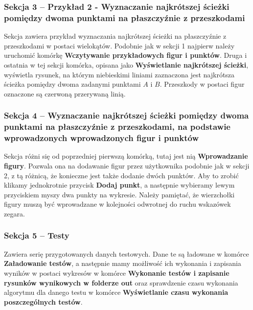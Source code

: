 \documentclass[12pt]{article}
\begin{document}
			\subsubsection{Sekcja 3 -- Przykład 2 - Wyznaczanie najkrótszej ścieżki pomiędzy dwoma punktami na płaszczyźnie z przeszkodami}
				Sekcja zawiera przykład wyznaczania najkrótszej ścieżki na płaszczyźnie z przeszkodami w postaci wielokątów. Podobnie jak w sekcji 1 najpierw należy uruchomić komórkę \textbf{Wczytywanie przykładowych figur i punktów}. Druga i ostatnia w tej sekcji komórka, opisana jako \textbf{Wyświetlanie najkrótszej ścieżki}, wyświetla rysunek, na którym niebieskimi liniami zaznaczona jest najkrótsza ścieżka pomiędzy dwoma zadanymi punktami $ A $ i $ B $. Przeszkody w postaci figur oznaczone są czerwoną przerywaną linią.
		
			\subsubsection{Sekcja 4 -- Wyznaczanie najkrótszej ścieżki pomiędzy dwoma punktami na płaszczyźnie z przeszkodami, na podstawie wprowadzonych wprowadzonych figur i punktów}
				Sekcja różni się od poprzedniej pierwszą komórką, tutaj jest nią \textbf{Wprowadzanie figury}. Pozwala ona na dodawanie figur przez użytkownika podobnie jak w sekcji 2, z tą różnicą, że konieczne jest także dodanie dwóch punktów. Aby to zrobić klikamy jednokrotnie przycisk \textbf{Dodaj punkt}, a następnie wybieramy lewym przyciskiem myszy dwa punkty na wykresie. Należy pamiętać, że wierzchołki figury muszą być wprowadzane w kolejności odwrotnej do ruchu wskazówek zegara.
			
			\subsubsection{Sekcja 5 -- Testy}
				Zawiera serię przygotowanych danych testowych. Dane te są ładowane w komórce \textbf{Załadowanie testów}, a następnie mamy możliwość ich wykonania i zapisania wyników w postaci wykresów w komórce \textbf{Wykonanie testów i zapisanie rysunków wynikowych w folderze out} oraz sprawdzenie czasu wykonania algorytmu dla danego testu w komórce \textbf{Wyświetlanie czasu wykonania poszczególnych testów}.
			
\end{document}
